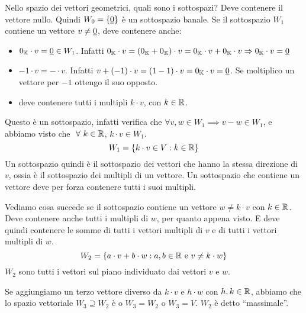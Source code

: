 
Nello spazio dei vettori geometrici, quali sono i sottospazi? Deve contenere il vettore nullo. Quindi $W_0 = \{ \underline{0} \}$ \`e un sottospazio banale. Se il sottospazio $W_1$ contiene un vettore $v \neq \underline{0}$, deve contenere anche:
\begin{itemize}
    \item $0_{\mathbb{K}} \cdot v = \underline{0} \in W_1$. Infatti $0_{\mathbb{K}} \cdot v = (0_{\mathbb{K}} + 0_{\mathbb{K}}) \cdot v = 0_{\mathbb{K}} \cdot v + 0_{\mathbb{K}} \cdot v \Rightarrow 0_{\mathbb{K}} \cdot v = \underline{0}$
    \item $-1 \cdot v = - \cdot v$. Infatti $v + (-1) \cdot v = (1 - 1) \cdot v = 0_{\mathbb{K}} \cdot v = \underline{0}$. Se moltiplico un vettore per $-1$ ottengo il suo opposto.
    \item deve contenere tutti i multipli $k \cdot v$, con $k \in \mathbb{R}$.
\end{itemize}
Questo \`e un sottospazio, infatti verifica che $\forall v, w \in W_1 \implies v - w \in W_1$, e abbiamo visto che $\forall k \in \reals$, $k \cdot v \in W_1$.
\[
W_1 = \{ k \cdot v \in V : k \in \mathbb{R} \}
\]
Un sottospazio quindi \`e il sottospazio dei vettori che hanno la stessa direzione di $v$, ossia \`e il sottospazio dei multipli di un vettore. Un sottospazio che contiene un vettore deve per forza contenere tutti i suoi multipli.

Vediamo cosa succede se il sottospazio contiene un vettore $w \neq k \cdot v$ con $k \in \mathbb{R}$. Deve contenere anche tutti i multipli di $w$, per quanto appena visto. E deve quindi contenere le somme di tutti i vettori multipli di $v$ e di tutti i vettori multipli di $w$.
\[
W_2 = \{ a \cdot v + b \cdot w : a, b \in \mathbb{R} \text{ e } v \neq k \cdot w \}
\]
$W_2$ sono tutti i vettori sul piano individuato dai vettori $v$ e $w$.


Se aggiungiamo un terzo vettore diverso da $k \cdot v$ e $h \cdot w$ con $h, k \in \mathbb{R}$, abbiamo che lo spazio vettoriale $W_3 \supseteq W_2$ \`e o $W_3 = W_2$ o $W_3 = V$. $W_2$ \`e detto ``massimale''.

